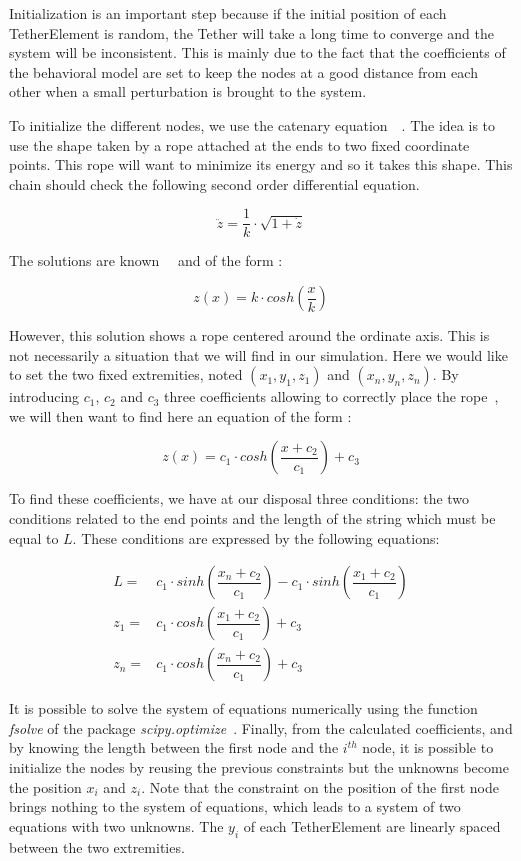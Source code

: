 Initialization is an important step because if the initial position of each TetherElement is random, the Tether will take a long time to converge and the system will be inconsistent. This is mainly due to the fact that the coefficients of the behavioral model are set to keep the nodes at a good distance from each other when a small perturbation is brought to the system.

To initialize the different nodes, we use the catenary equation~\cite{obrien_general_1968}~\cite{ren_parabolic_2008}. The idea is to use the shape taken by a rope attached at the ends to two fixed coordinate points. This rope will want to minimize its energy and so it takes this shape. This chain should check the following second order differential equation.

$$\ddot{z} = \frac{1}{k} \cdot \sqrt{1 + \dot{z}}$$

The solutions are known~\cite{obrien_general_1968}~\cite{ren_parabolic_2008} and of the form :

$$z(x) = k \cdot cosh\left(\frac{x}{k}\right)$$

However, this solution shows a rope centered around the ordinate axis. This is not necessarily a situation that we will find in our simulation. Here we would like to set the two fixed extremities, noted $(x_1, y_1, z_1)$ and $(x_n, y_n, z_n)$. By introducing $c_1$, $c_2$ and $c_3$ three coefficients allowing to correctly place the rope~\cite{ren_parabolic_2008}, we will then want to find here an equation of the form :

$$z(x) = c_1 \cdot cosh\left(\frac{x+c_2}{c_1}\right)+c_3$$

To find these coefficients, we have at our disposal three conditions: the two conditions related to the end points and the length of the string which must be equal to $L$. These conditions are expressed by the following equations:

\begin{align*}
    L = & c_1 \cdot sinh\left(\dfrac{x_n+c_2}{c_1}\right) - c_1 \cdot sinh\left(\dfrac{x_1+c_2}{c_1}\right) \\
    z_1 = & c_1 \cdot cosh\left(\dfrac{x_1+c_2}{c_1}\right)+c_3 \\
    z_n = & c_1 \cdot cosh\left(\dfrac{x_n+c_2}{c_1}\right)+c_3
\end{align*}

It is possible to solve the system of equations numerically using the function \textit{fsolve} of the package \textit{scipy.optimize}~\cite{noauthor_scipyorg_nodate}. Finally, from the calculated coefficients, and by knowing the length between the first node and the $i^{th}$ node, it is possible to initialize the nodes by reusing the previous constraints but the unknowns become the position $x_i$ and $z_i$. Note that the constraint on the position of the first node brings nothing to the system of equations, which leads to a system of two equations with two unknowns. The $y_i$ of each TetherElement are linearly spaced between the two extremities.